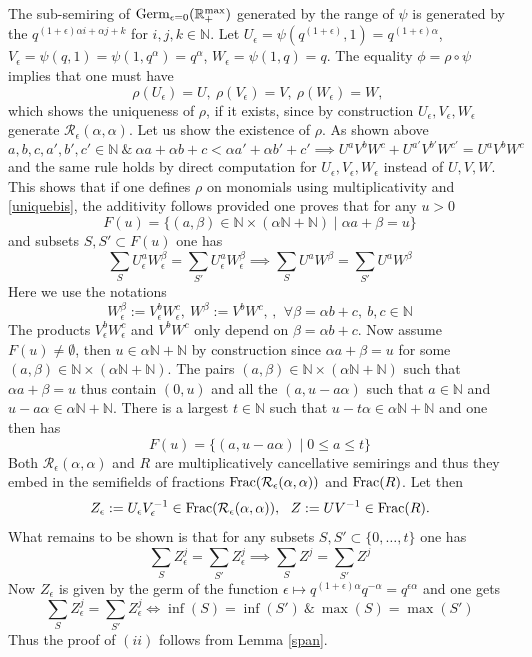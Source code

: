 \documentclass[noams,lp]{compositio}
\def\N{{\mathbb N}}
\def\R{{\mathbb R}}
\def\cR{{\mathcal R}}
\def\qqq{\,,\,~\forall}
\def\mc{multiplicatively cancellative }
\def\rmax{\R_+^{\rm max}}
\def\germ{{{\rm Germ}_{\epsilon=0}(\rmax)}}
\begin{document}
The sub-semiring of $\germ$ generated by the range of $\psi$ is generated by the $q^{(1+\epsilon)\alpha i+\alpha j+k}$ for $i,j,k\in\N$.
Let $U_\epsilon=\psi(q^{(1+\epsilon)},1)=q^{(1+\epsilon)\alpha}$, $V_\epsilon=\psi(q,1)=\psi(1,q^{\alpha})=q^{\alpha}$,  $W_\epsilon=\psi(1,q)=q$. The equality $\phi=\rho\circ\psi$ implies that one must have 
\begin{equation}\label{uniquebis}
\rho(U_\epsilon)=U, \    \rho(V_\epsilon)=V, \    \rho(W_\epsilon)=W, \    
\end{equation}
which shows the uniqueness of $\rho$, if it exists, since by construction $U_\epsilon,V_\epsilon,W_\epsilon$ generate $\cR_\epsilon(\alpha,\alpha)$. Let us show the existence of $\rho$. As shown above
$$
a,b,c,a',b',c'\in \N\ \&\ \alpha a+\alpha b+c<\alpha a'+\alpha b'+c' \implies U^aV^bW^c+U^{a'}V^{b'}W^{c'}=U^aV^bW^c
$$
and the same rule holds by direct computation for $U_\epsilon,V_\epsilon,W_\epsilon$ instead of $U,V,W$. This shows that if one defines $\rho$ on monomials using multiplicativity and \eqref{uniquebis}, the additivity follows provided one proves that for any $u>0$ 
$$
F(u)=\{(a,\beta)\in \N\times (\alpha\N+\N)\mid \alpha a+\beta=u\}
$$
and subsets $S,S'\subset F(u)$ one has
$$
\sum_S U_\epsilon^aW_\epsilon^\beta=\sum_{S'} U_\epsilon^aW_\epsilon^\beta \implies
\sum_S U^a W^\beta=\sum_{S'} U^a W^\beta
$$
Here we use the notations
$$
W_\epsilon^\beta:=V_\epsilon^{b} W_\epsilon^c, \  W^\beta:=V^{b} W^c, \qqq  \beta=\alpha b+c, \ b,c\in\N
$$
The products $V_\epsilon^{b} W_\epsilon^c$ and $V^{b} W^c$ only depend on $\beta=\alpha b+c$.
Now assume $F(u)\neq \emptyset$, then $u\in \alpha\N+\N$ by construction since $\alpha a+\beta=u$ for some $(a,\beta)\in \N\times (\alpha\N+\N)$. The pairs $(a,\beta)\in \N\times (\alpha\N+\N)$ such that $\alpha a+\beta=u$ thus contain $(0,u)$ and all the $(a,u-a\alpha)$ such that $a\in \N$ and $u-a\alpha\in \alpha\N+\N$. There is a largest $t\in \N$ such that $u-t\alpha\in \alpha\N+\N$ and one then has 
$$
F(u)=\{(a,u-a\alpha)\mid 0\leq  a \leq t\}
$$
 Both $\cR_\epsilon(\alpha,\alpha)$ and $R$ are \mc semirings and thus they embed in the semifields of fractions ${\rm Frac}(\cR_\epsilon(\alpha,\alpha))$ and ${\rm Frac}(R)$. Let then
$$
Z_\epsilon:=U_\epsilon V_\epsilon^{-1}\in {\rm Frac}(\cR_\epsilon(\alpha,\alpha)),
\  \  Z:=UV^{-1}\in {\rm Frac}(R).
$$
What  remains to be shown is that for any subsets $S,S'\subset \{0,\ldots,t\}$ one has 
$$
\sum_S Z_\epsilon^j=\sum_{S'} Z_\epsilon^j \implies
\sum_S Z^j=\sum_{S'} Z^j
$$
Now $Z_\epsilon$ is given by the germ of the function $\epsilon\mapsto q^{(1+\epsilon)\alpha}q^{-\alpha}=q^{\epsilon \alpha}$ and one gets 
$$
\sum_S Z_\epsilon^j=\sum_{S'} Z_\epsilon^j\iff \inf(S)=\inf(S')\ \& \ \max(S)=\max(S')
$$
Thus the proof of $(ii)$ follows from  Lemma \ref{span}. \endproof
\end{document}
